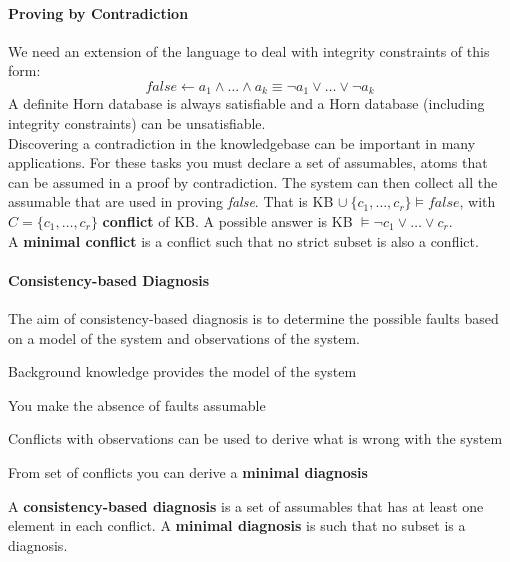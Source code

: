 \documentclass[10pt]{report}
\begin{document}
\paragraph{Proving by Contradiction} We need an extension of the language to deal with integrity constraints of this form: $$false \leftarrow a_1\wedge\ldots\wedge a_k \equiv \neg a_1\vee\ldots\vee\neg a_k$$
A definite Horn database is always satisfiable and a Horn database (including integrity constraints) can be unsatisfiable.\\
Discovering a contradiction in the knowledgebase can be important in many applications. For these tasks you must declare a set of assumables, atoms that can be assumed in a proof by contradiction. The system can then collect all the assumable that are used in proving \textit{false}. That is KB $\cup\:\{c_1,\ldots,c_r\}\vDash false$, with $C=\{c_1,\ldots,c_r\}$ \textbf{conflict} of KB. A possible answer is KB $\vDash \neg c_1\vee\ldots\vee c_r$.\\
A \textbf{minimal conflict} is a conflict such that no strict subset is also a conflict.
\paragraph{Consistency-based Diagnosis} The aim of consistency-based diagnosis is to determine the possible faults based on a model of the system and observations of the system.\begin{list}{}{}
	\item Background knowledge provides the model of the system
	\item You make the absence of faults assumable
	\item Conflicts with observations can be used to derive what is wrong with the system
	\item From set of conflicts you can derive a \textbf{minimal diagnosis}
\end{list}
A \textbf{consistency-based diagnosis} is a set of assumables that has at least one element in each conflict. A \textbf{minimal diagnosis} is such that no subset is a diagnosis.
\end{document}

